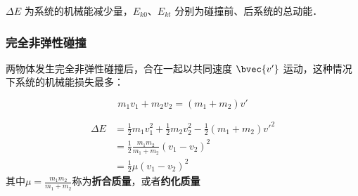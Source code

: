 $\Delta E$ 为系统的机械能减少量，$E_{k0}$、$ E_{kt}$ 分别为碰撞前、后系统的总动能．

\subsubsection{完全非弹性碰撞}

两物体发生完全非弹性碰撞后，合在一起以共同速度 $\bvec {v'}$ 运动，这种情况下系统的机械能损失最多：

\begin{equation}
m_1v_1+m_2v_2=(m_1+m_2)v'
\end{equation}

\begin{equation}
\begin{aligned}
\Delta E&=\frac12m_1v_1^2+\frac12m_2v_2^2-\frac12(m_1+m_2)v'^2\\
&=\frac{1}{2}\frac{m_1m_2}{m_1+m_2}\left(v_1-v_2\right)^2\\
&=\frac{1}{2}\mu \left(v_1-v_2\right)^2
\end{aligned}
\end{equation}
其中$\mu=\frac{m_1m_2}{m_1+m_2}$称为\textbf{折合质量}，或者\textbf{约化质量}

\sub
{}